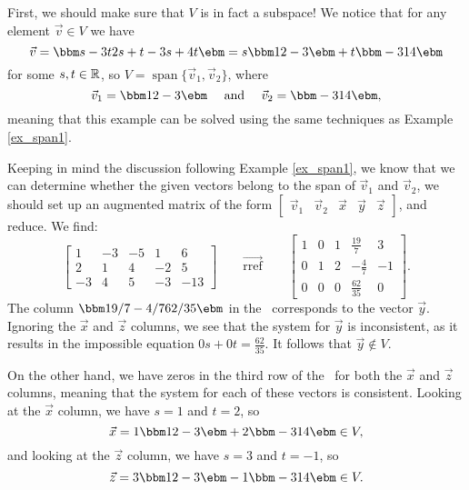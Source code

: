 {First, we should make sure that $V$ is in fact a subspace! We notice that for any element $\vec v\in V$ we have
\[
\vec v = \bbm s-3t\\2s+t\\-3s+4t\ebm = s\bbm 1\\2\\-3\ebm + t\bbm -3\\1\\4\ebm
\]
for some $s,t\in\mathbb{R}$, so $V = \operatorname{span}\{\vec{v}_1,\vec{v}_2\}$, where
\[
\vec{v}_1 = \bbm 1\\2\\-3\ebm \quad \text{ and } \quad \vec{v}_2=\bbm -3\\1\\4\ebm,
\]
meaning that this example can be solved using the same techniques as Example \ref{ex_span1}.

Keeping in mind the discussion following Example \ref{ex_span1}, we know that we can determine whether the given vectors belong to the span of $\vec{v}_1$ and $\vec{v}_2$, we should set up an augmented matrix of the form $[\begin{array}{cc|c|c|c} \vec{v}_1 & \vec{v}_2 & \vec x & \vec y & \vec z\end{array}]$, and reduce. We find:
\[
\left[\begin{array}{cc|c|c|c}
1&-3&-5&1&6\\
2&1&4&-2&5\\
-3&4&5&-3&-13
\end{array}\right]\qquad \overrightarrow{\text{rref}}\qquad
\left[\begin{array}{cc|c|c|c}
1&0&1&\frac{19}{7}&3\\
0&1&2&-\frac{4}{7}&-1\\
0&0&0&\frac{62}{35}&0
\end{array}\right].
\]
The column $\bbm 19/7\\-4/7\\62/35\ebm$ in the \rref\ corresponds to the vector $\vec y$. Ignoring the $\vec x$ and $\vec z$ columns, we see that the system for $\vec y$ is inconsistent, as it results in the impossible equation $0s+0t = \frac{62}{35}$. It follows that $\vec y\notin V$. 

On the other hand, we have zeros in the third row of the \rref\ for both the $\vec x$ and $\vec z$ columns, meaning that the system for each of these vectors is consistent. Looking at the $\vec x$ column, we have $s=1$ and $t=2$, so
\[
\vec x = 1\bbm 1\\2\\-3\ebm +2\bbm -3\\1\\4\ebm \in V,
\]
and looking at the $\vec z$ column, we have $s=3$ and $t=-1$, so
\[
\vec z = 3\bbm 1\\2\\-3\ebm -1\bbm -3\\1\\4\ebm \in V.
\]

\baselineskip
}


